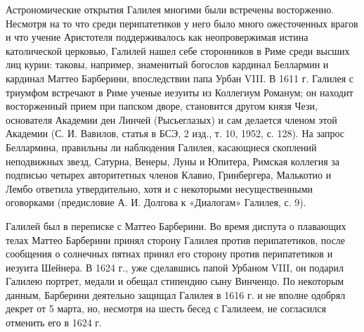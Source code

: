 Астрономические открытия  Галилея многими были  встречены восторженно.
Несмотря на то что среди  перипатетиков у него было много ожесточенных
врагов  и  что  учение Аристотеля  поддерживалось  как  неопровержимая
истина католической  церковью, Галилей  нашел себе сторонников  в Риме
среди высших лиц курии: таковы, например, знаменитый богослов кардинал
Беллармин и  кардинал Маттео Барберини, впоследствии  папа Урбан VIII.
В  1611  г.  Галилея  с  триумфом  встречают  в  Риме  ученые  иезуиты
из  Коллегиум  Романум;  он  находит восторженный  прием  при  папском
дворе, становится  другом князя  Чези, основателя Академии  ден Линчей
(Рысьеглазых)  и сам  делается членом  этой Академии  (С. И.  Вавилов,
статья в  БСЭ, 2  изд., т.  10, 1952, с.  128). На  запрос Беллармина,
правильны  ли  наблюдения  Галилея, касающиеся  скоплений  неподвижных
звезд, Сатурна, Венеры,  Луны и Юпитера, Римская  коллегия за подписью
четырех  авторитетных членов  Клавио, Гринбергера,  Малькотио и  Лембо
ответила утвердительно, хотя и с некоторыми несущественными оговорками
(предисловие А. И. Долгова к «Диалогам» Галилея, с. 9).

Галилей  был  в переписке  с  Маттео  Барберини.  Во время  диспута  о
плавающих  телах  Маттео  Барберини   принял  сторону  Галилея  против
перипатетиков, после  сообщения о солнечных пятнах  принял его сторону
против  перипатетиков и  иезуита Шейнера.  В 1624  г., уже  сделавшись
папой  Урбаном  VIII, он  подарил  Галилею  портрет, медали  и  обещал
стипендию  сыну Винченцо.  По  некоторым  данным, Барберини  деятельно
защищал Галилея в 1616  г. и не вполне одобрял декрет  от 5 марта, но,
несмотря на шесть бесед с Галилеем,  не согласился отменить его в 1624
г.

